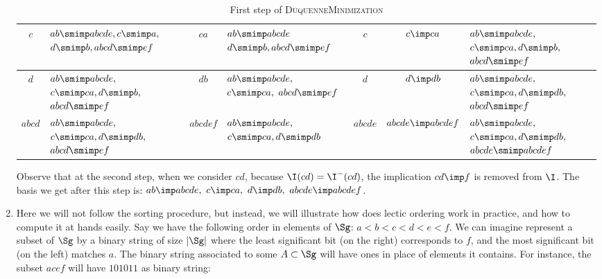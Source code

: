 \begin{enumerate}
\begin{table}[ht]
\begin{tabular}{| c || p{2.7cm} | c | p{2.5cm} | c | c | p{2.7cm} | }
	$c$ & $ab \smimp abcde, c \smimp a,$ \newline $d \smimp b, abcd \smimp ef$ & $ca$ & $ab \smimp abcde$ \newline $d \smimp b, abcd \smimp ef$ & $c$ & 
	$c \imp ca$ & $ab \smimp abcde,$ \newline $c \smimp ca, d \smimp b,$ \newline $abcd \smimp ef$ \\ \hline
	
	$d$ & $ab \smimp abcde,$ \newline $c \smimp ca, d \smimp b,$ \newline $abcd \smimp ef$ & $db$ & $ab \smimp abcde,$ \newline $c \smimp ca,$ \newline $abcd \smimp ef$ & $d$ & $d \imp db$ & $ab \smimp abcde,$ \newline $c \smimp ca, d \smimp db,$ \newline $abcd \smimp ef$ \\ \hline
	
	$abcd$ & $ab \smimp abcde,$ \newline $c \smimp ca, d \smimp db,$ \newline $abcd \smimp ef$ & $abcdef$ & $ab \smimp abcde,$ \newline $c \smimp ca, d \smimp db$ & $abcde$ & $abcde \imp abcdef$ & $ab \smimp abcde,$ \newline $c \smimp ca, d \smimp db,$ \newline $abcde \smimp abcdef$ \\ \hline
		
	\end{tabular}

\caption{First step of \textsc{DuquenneMinimization}}
\label{tab:duq-red}
\end{table}
Observe that at the second step, when we consider $cd$, because $\I(cd) = \I^{-}(cd)$, the implication $cd \imp f$ is removed from $\I$. The basis we get
after this step is: $ab \imp abcde, \ c \imp ca, \ d \imp db, \  abcde \imp abcdef$.

\item {} Here we will not follow the sorting procedure, but instead, we will illustrate how does lectic ordering work in practice, and how to compute it at hands easily. Say we have the following  order in elements of $\Sg$: $a < b < c < d < e < f$. We can imagine represent
a subset of $\Sg$ by a binary string of size $|\Sg|$ where the least significant bit (on the right) corresponds to $f$, and the most significant bit
(on the left) matches $a$. The binary string associated to some $A \subset \Sg$ will have ones in place of elements it contains. For instance, the subset 
$acef$ will have $101011$ as binary string:


\end{enumerate}
